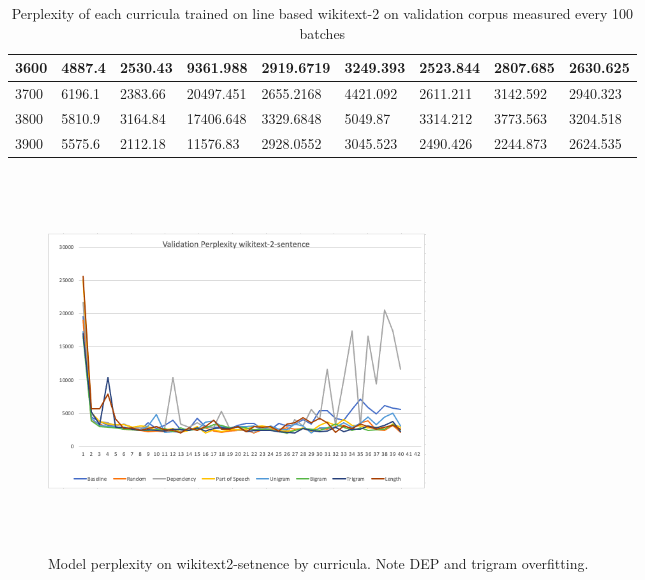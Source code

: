\begin{table}[]
{\begin{tabular}{|l|l|l|l|l|l|l|l|l|}
3600 & 4887.4 & 2530.43 & 9361.988 & 2919.6719 & 3249.393 & 2523.844 & 2807.685 & 2630.625 \\ \hline
3700 & 6196.1 & 2383.66 & 20497.451 & 2655.2168 & 4421.092 & 2611.211 & 3142.592 & 2940.323 \\ \hline
3800 & 5810.9 & 3164.84 & 17406.648 & 3329.6848 & 5049.87 & 3314.212 & 3773.563 & 3204.518 \\ \hline
3900 & 5575.6 & 2112.18 & 11576.83 & 2928.0552 & 3045.523 & 2490.426 & 2244.873 & 2624.535 \\ \hline
\end{tabular}
}
\caption{Perplexity of each curricula trained on line based wikitext-2 on validation corpus measured every 100 batches}
\label{tab:wikitext2-sentence-perplexity}
\end{table}


\begin{figure}[h]
\centering
\includegraphics[width=10cm, height=10cm]{Thesis/images/wiki2-sentence-valid.png}
\caption{Model perplexity on wikitext2-setnence by curricula. Note DEP and trigram overfitting.}
\end{figure}


